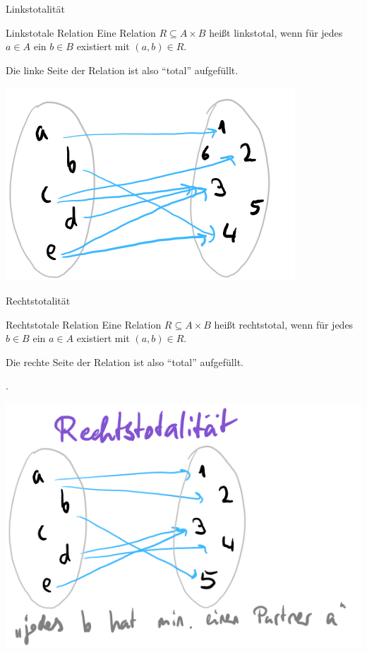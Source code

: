 \begin{frame}{Linkstotalität}
	\begin{block}{Linkstotale Relation}
		Eine Relation $R \subseteq A \times B$ heißt linkstotal\pause , wenn für jedes $a \in A$ ein $b \in B$ existiert mit $(a,b) \in R$.
	\end{block}\pause
	
	Die linke Seite der Relation ist also ``total'' aufgefüllt.\pause
	
	\begin{center}
		\includegraphics[width=.5\linewidth]{images/mengen_linkstotal.png}
	\end{center}
\end{frame}

\begin{frame}{Rechtstotalität}
	\begin{block}{Rechtstotale Relation}
		Eine Relation $R \subseteq A \times B$ heißt rechtstotal\pause , wenn für jedes $b \in B$ ein $a \in A$ existiert mit $(a,b) \in R$.
	\end{block}\pause
	
	Die rechte Seite der Relation ist also ``total'' aufgefüllt.\pause
	
	 .\pause
	
	\begin{center}
		\includegraphics[width=.5\linewidth]{images/mengen_rechtstotal.png}
	\end{center}
\end{frame}

